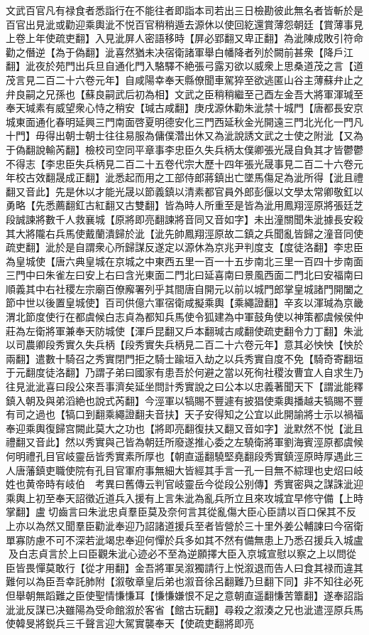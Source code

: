 文武百官凡有禄食者悉詣行在不能往者即詣本司若出三日檢勘彼此無名者皆斬於是百官出見泚或勸迎乘輿泚不悦百官稍稍遁去源休以使回紇還賞薄怨朝廷【賞薄事見上卷上年使疏吏翻】入見泚屏人密語移時【屏必郢翻又卑正翻】為泚陳成敗引符命勸之僭逆【為于偽翻】泚喜然猶未决宿衛諸軍舉白幡降者列於闕前甚衆【降戶江翻】泚夜於苑門出兵旦自通化門入駱驛不絶張弓露刃欲以威衆上思桑道茂之言【道茂言見二百二十六卷元年】自咸陽幸奉天縣僚聞車駕猝至欲逃匿山谷主薄蘇弁止之弁良嗣之兄孫也【蘇良嗣武后初為相】文武之臣稍稍繼至己酉左金吾大將軍渾瑊至奉天瑊素有威望衆心恃之稍安【瑊古咸翻】庚戌源休勸朱泚禁十城門【唐都長安京城東面通化春明延興三門南面啓夏明德安化三門西延秋金光開遠三門北光化一門凡十門】毋得出朝士朝士往往易服為傭僕濳出休又為泚說誘文武之士使之附泚【又為于偽翻說輸芮翻】檢校司空同平章事李忠臣久失兵柄太僕卿張光晟自負其才皆鬱鬱不得志【李忠臣失兵柄見二百二十五卷代宗大歷十四年張光晟事見二百二十六卷元年校古效翻晟成正翻】泚悉起而用之工部侍郎蔣鎮出亡墜馬傷足為泚所得【泚且禮翻又音此】先是休以才能光晟以節義鎮以清素都官員外郎彭偃以文學太常卿敬釭以勇略【先悉薦翻釭古紅翻又古雙翻】皆為時人所重至是皆為泚用鳳翔涇原將張廷芝段誠諫將數千人救襄城【原將即亮翻諫將音同又音如字】未出潼關聞朱泚據長安殺其大將隴右兵馬使戴蘭潰歸於泚【泚先帥鳳翔涇原故二鎮之兵聞亂皆歸之潼音同使疏吏翻】泚於是自謂衆心所歸謀反遂定以源休為京兆尹判度支【度徒洛翻】李忠臣為皇城使【唐六典皇城在京城之中東西五里一百一十五步南北三里一百四十步南面三門中曰朱雀左曰安上右曰含光東面二門北曰延喜南曰景風西面二門北曰安福南曰順義其中右社稷左宗廟百僚廨署列乎其間唐自開元以前以城門郎掌皇城諸門開闔之節中世以後置皇城使】百司供億六軍宿衛咸擬乘輿【乘繩證翻】辛亥以渾瑊為京畿渭北節度使行在都虞候白志貞為都知兵馬使令狐建為中軍鼓角使以神策都虞候侯仲莊為左衛將軍兼奉天防城使【渾戶昆翻又戶本翻瑊古咸翻使疏吏翻令力丁翻】朱泚以司農卿段秀實久失兵柄【段秀實失兵柄見二百二十六卷元年】意其必怏怏【怏於兩翻】遣數十騎召之秀實閉門拒之騎士踰垣入劫之以兵秀實自度不免【騎奇寄翻垣于元翻度徒洛翻】乃謂子弟曰國家有患吾於何避之當以死徇社稷汝曹宜人自求生乃往見泚泚喜曰段公來吾事濟矣延坐問計秀實說之曰公本以忠義著聞天下【謂泚能釋鎮入朝及與弟滔絶也說式芮翻】今涇軍以犒賜不豐遽有披猖使乘輿播越夫犒賜不豐有司之過也【犒口到翻乘繩證翻夫音扶】天子安得知之公宜以此開諭將士示以禍福奉迎乘輿復歸宫闕此莫大之功也【將即亮翻復扶又翻又音如字】泚默然不悦【泚且禮翻又音此】然以秀實與己皆為朝廷所廢遂推心委之左驍衛將軍劉海賓涇原都虞候何明禮孔目官岐靈岳皆秀實素所厚也【朝直遥翻驍堅堯翻段秀實鎮涇原時厚遇此三人唐藩鎮吏職使院有孔目官軍府事無細大皆經其手言一孔一目無不綜理也史炤曰岐姓也黄帝時有岐伯　考異曰舊傳云判官岐靈岳今從段公别傳】秀實密與之謀誅泚迎乘輿上初至奉天詔徵近道兵入援有上言朱泚為亂兵所立且來攻城宜早修守備【上時掌翻】盧切齒言曰朱泚忠貞羣臣莫及奈何言其從亂傷大臣心臣請以百口保其不反上亦以為然又聞羣臣勸泚奉迎乃詔諸道援兵至者皆營於三十里外姜公輔諫曰今宿衛單寡防慮不可不深若泚竭忠奉迎何憚於兵多如其不然有備無患上乃悉召援兵入城盧及白志貞言於上曰臣觀朱泚心迹必不至為逆願擇大臣入京城宣慰以察之上以問從臣皆畏憚莫敢行【從才用翻】金吾將軍吴溆獨請行上悦溆退而告人曰食其禄而違其難何以為臣吾幸託肺附【溆敬章皇后弟也溆音徐呂翻難乃旦翻下同】非不知往必死但舉朝無蹈難之臣使聖情慊慊耳【慊慊嫌恨不足之意朝直遥翻慊苦簟翻】遂奉詔詣泚泚反謀已决雖陽為受命館溆於客省【館古玩翻】尋殺之溆湊之兄也泚遣涇原兵馬使韓旻將鋭兵三千聲言迎大駕實襲奉天【使疏吏翻將即亮